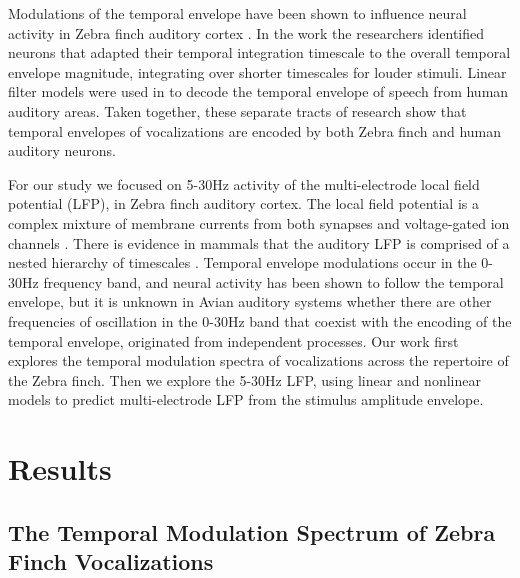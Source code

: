 Modulations of the temporal envelope have been shown to influence neural activity in Zebra finch auditory cortex \cite{Nagel2006}. In the work the researchers identified neurons that adapted their temporal integration timescale to the overall temporal envelope magnitude, integrating over shorter timescales for louder stimuli. Linear filter models were used in \cite{Pasley2012} to decode the temporal envelope of speech from human auditory areas. Taken together, these separate tracts of research show that temporal envelopes of vocalizations are encoded by both Zebra finch and human auditory neurons.

For our study we focused on 5-30Hz activity of the multi-electrode local field potential (LFP), in Zebra finch auditory cortex. The local field potential is a complex mixture of membrane currents from both synapses and voltage-gated ion channels \cite{Buzsaki2012b}. There is evidence in mammals that the auditory LFP is comprised of a nested hierarchy of timescales \cite{Lakatos2005}. Temporal envelope modulations occur in the 0-30Hz frequency band, and neural activity has been shown to follow the temporal envelope, but it is unknown in Avian auditory systems whether there are other frequencies of oscillation in the 0-30Hz band that coexist with the encoding of the temporal envelope, originated from independent processes. Our work first explores the temporal modulation spectra of vocalizations across the repertoire of the Zebra finch. Then we explore the 5-30Hz LFP, using linear and nonlinear models to predict multi-electrode LFP from the stimulus amplitude envelope.

\section{Results}

\subsection{The Temporal Modulation Spectrum of Zebra Finch Vocalizations}

